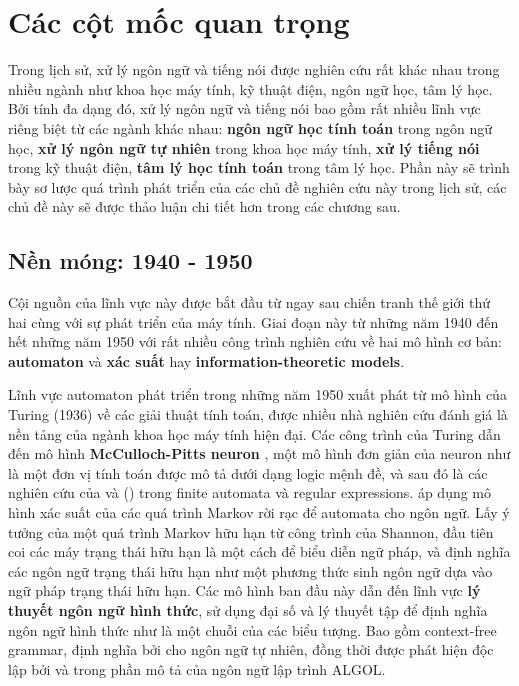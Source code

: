 \section{Các cột mốc quan trọng}

Trong lịch sử, xử lý ngôn ngữ và tiếng nói được nghiên cứu rất khác nhau trong nhiều ngành như khoa học máy tính, kỹ thuật điện, ngôn ngữ học, tâm lý học. Bởi tính đa dạng đó, xử lý ngôn ngữ và tiếng nói bao gồm rất nhiều lĩnh vực riêng biệt từ các ngành khác nhau: \textbf{ngôn ngữ học tính toán} trong ngôn ngữ học, \textbf{xử lý ngôn ngữ tự nhiên} trong khoa học máy tính, \textbf{xử lý tiếng nói} trong kỹ thuật điện, \textbf{tâm lý học tính toán} trong tâm lý học. Phần này sẽ trình bày sơ lược quá trình phát triển của các chủ đề nghiên cứu này trong lịch sử, các chủ đề này sẽ được thảo luận chi tiết hơn trong các chương sau.

\subsection{Nền móng: 1940 - 1950}

Cội nguồn của lĩnh vực này được bắt đầu từ ngay sau chiến tranh thế giới thứ hai cùng với sự phát triển của máy tính. Giai đoạn này từ những năm 1940 đến hết những năm 1950 với rất nhiều công trình nghiên cứu về hai mô hình cơ bản: \textbf{automaton} và \textbf{xác suất} hay \textbf{information-theoretic models}.

Lĩnh vực automaton phát triển trong những năm 1950 xuất phát từ mô hình của Turing (1936) về các giải thuật tính toán, được nhiều nhà nghiên cứu đánh giá là nền tảng của ngành khoa học máy tính hiện đại. Các công trình của Turing dẫn đến mô hình \textbf{McCulloch-Pitts neuron} \citep{mcculloch1943logical}, một mô hình đơn giản của neuron như là một đơn vị tính toán được mô tả dưới dạng logic mệnh đề, và sau đó là các nghiên cứu của \citet{kleene1951representation} và (\citeyear{Kleene56}) trong finite automata và regular expressions. \citet{shannon1948mathematical} áp dụng mô hình xác suất của các quá trình Markov rời rạc để automata cho ngôn ngữ. Lấy ý tưởng của một quá trình Markov hữu hạn từ công trình của Shannon, \citet{chomsky1956logical} đầu tiên coi các máy trạng thái hữu hạn là một cách để biểu diễn ngữ pháp, và định nghĩa các ngôn ngữ trạng thái hữu hạn như một phương thức sinh ngôn ngữ dựa vào ngữ pháp trạng thái hữu hạn. Các mô hình ban đầu này dẫn đến lĩnh vực \textbf{lý thuyết ngôn ngữ hình thức}, sử dụng đại số và lý thuyết tập để định nghĩa ngôn ngữ hình thức như là một chuỗi của các biểu tượng. Bao gồm context-free grammar, định nghĩa bởi \citet{chomsky1956logical} cho ngôn ngữ tự nhiên, đồng thời được phát hiện độc lập bởi \citet{Backus1959TheSA} và \citet{Backus1960ReportOT} trong phần mô tả của ngôn ngữ lập trình ALGOL.

